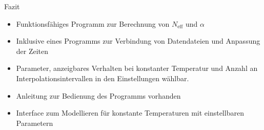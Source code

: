 \documentclass[aspectratio=1610, 9pt]{beamer}
\begin{document}
\begin{frame}{Fazit}
  \begin{itemize}
    \item Funktionsfähiges Programm zur Berechnung von $N_{\mathrm{eff}}$ und $\alpha$
    \medskip
    \item Inklusive eines Programms zur Verbindung von Datendateien und Anpassung der Zeiten
    \medskip
    \item Parameter, anzeigbares Verhalten bei konstanter Temperatur und Anzahl an Interpolationsintervallen in den
    Einstellungen wählbar.
    \medskip
    \item Anleitung zur Bedienung des Programms vorhanden
    \medskip
    \item Interface zum Modellieren für konstante Temperaturen mit einstellbaren Parametern
  \end{itemize}
\end{frame}
\end{document}

